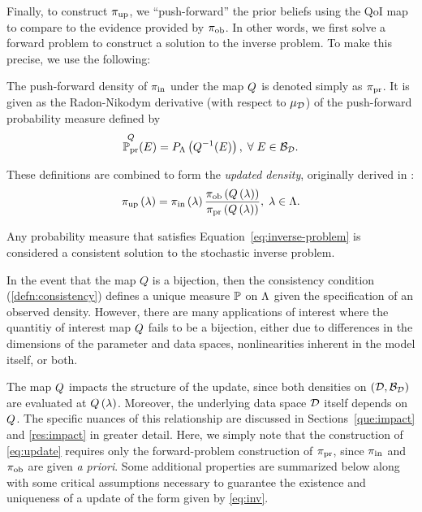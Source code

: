Finally, to construct $\operatorname*{\pi_{up}}$, we ``push-forward'' the prior beliefs using the QoI map to compare to the evidence provided by $\operatorname*{\pi_{ob}}$. 
In other words, we first solve a forward problem to construct a solution to the inverse problem. 
To make this precise, we use the following:

\begin{defn}\label{defn:predicted}
The push-forward density of $\operatorname*{\pi_{in}}$ under the map $Q$ is denoted simply as $\operatorname*{\pi_{pr}}$. 
It is given as the Radon-Nikodym derivative (with respect to $\mu_{\mathcal{D}}$) of the push-forward probability measure defined by 
\begin{equation}\label{eq:predicted}
\operatorname*{\mathbb{P}_{pr}}^Q (E)  = P_{\Lambda} \left ( Q^{-1}(E) \right ), \; \forall \; E \in \mathcal{B}_{\mathcal{D}}.
\end{equation}
\end{defn}

These definitions are combined to form the \emph{updated density}, originally derived in \cite{BJW18}:
\begin{equation}\label{eq:update}
\operatorname*{\pi_{up}} \left ( \lambda \right ) = \operatorname*{\pi_{in}} \left ( \lambda \right ) \frac{\operatorname*{\pi_{ob}} \left ( Q\left ( \lambda \right ) \right ) }{\operatorname*{\pi_{pr}} \left ( Q\left ( \lambda \right ) \right ) }, \; \lambda \in {\Lambda}.
\end{equation}

Any probability measure that satisfies Equation~\ref{eq:inverse-problem} is considered a consistent solution to the stochastic inverse problem.

In the event that the map $Q$ is a bijection, then the consistency condition (\ref{defn:consistency}) defines a unique measure $\mathbb{P}$ on ${\Lambda}$ given the specification of an observed density.
However, there are many applications of interest where the quantitiy of interest map $Q$ fails to be a bijection, either due to differences in the dimensions of the parameter and data spaces, nonlinearities inherent in the model itself, or both. 

The map $Q$ impacts the structure of the update, since both densities on $(\mathcal{D}, \mathcal{B}_{\mathcal{D}})$ are evaluated at $Q\left ( \lambda \right )$.
Moreover, the underlying data space $\mathcal{D}$ itself depends on $Q$.
The specific nuances of this relationship are discussed in Sections~\ref{que:impact} and \ref{res:impact} in greater detail.
Here, we simply note that the construction of \eqref{eq:update} requires only the forward-problem construction of $\operatorname*{\pi_{pr}}$, since $\operatorname*{\pi_{in}}$ and $\operatorname*{\pi_{ob}}$ are given \emph{a priori}.
Some additional properties are summarized below along with some critical assumptions necessary to guarantee the existence and uniqueness of a update of the form given by \eqref{eq:inv}. 